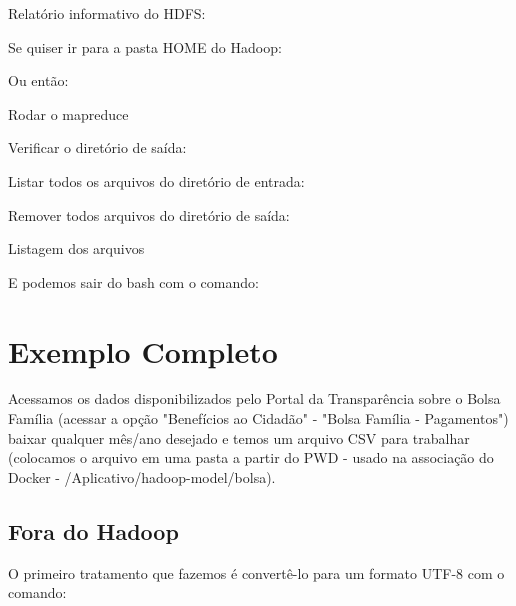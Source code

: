 \documentclass[a4paper,11pt]{article}
\begin{document}
Relatório informativo do HDFS: \\

Se quiser ir para a pasta HOME do Hadoop: \\

Ou então:

Rodar o mapreduce \\

Verificar o diretório de saída: \\

Listar todos os arquivos do diretório de entrada: \\

Remover todos arquivos do diretório de saída: \\

Listagem dos arquivos \\

E podemos sair do bash com o comando: \\

\section{Exemplo Completo}
Acessamos os dados disponibilizados pelo Portal da Transparência\cite{portaltransp} sobre o Bolsa Família (acessar a opção "Benefícios ao Cidadão" - "Bolsa Família - Pagamentos") baixar qualquer mês/ano desejado e temos um arquivo CSV para trabalhar (colocamos o arquivo em uma pasta a partir do PWD - usado na associação do Docker - /Aplicativo/hadoop-model/bolsa).

\subsection{Fora do Hadoop}
O primeiro tratamento que fazemos é convertê-lo para um formato UTF-8 com o comando: \\
\end{document}
